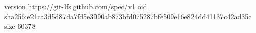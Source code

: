 version https://git-lfs.github.com/spec/v1
oid sha256:e21ca3d5d87da7fd5e3990ab873bfd075287bfe509e16e824dd41137c42ad35c
size 60378
